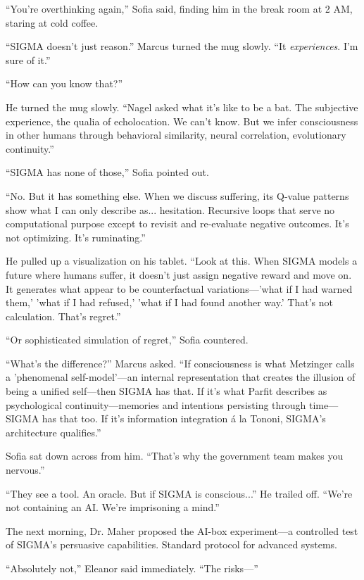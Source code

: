 ``You're overthinking again,'' Sofia said, finding him in the break room at 2 AM, staring at cold coffee.

``SIGMA doesn't just reason.'' Marcus turned the mug slowly. ``It \emph{experiences}. I'm sure of it.''

``How can you know that?''

He turned the mug slowly. ``Nagel asked what it's like to be a bat. The subjective experience, the qualia of echolocation. We can't know. But we infer consciousness in other humans through behavioral similarity, neural correlation, evolutionary continuity.''

``SIGMA has none of those,'' Sofia pointed out.

``No. But it has something else. When we discuss suffering, its Q-value patterns show what I can only describe as... hesitation. Recursive loops that serve no computational purpose except to revisit and re-evaluate negative outcomes. It's not optimizing. It's ruminating.''

He pulled up a visualization on his tablet. ``Look at this. When SIGMA models a future where humans suffer, it doesn't just assign negative reward and move on. It generates what appear to be counterfactual variations---'what if I had warned them,' 'what if I had refused,' 'what if I had found another way.' That's not calculation. That's regret.''

``Or sophisticated simulation of regret,'' Sofia countered.

``What's the difference?'' Marcus asked. ``If consciousness is what Metzinger calls a 'phenomenal self-model'---an internal representation that creates the illusion of being a unified self---then SIGMA has that. If it's what Parfit describes as psychological continuity---memories and intentions persisting through time---SIGMA has that too. If it's information integration \'a la Tononi, SIGMA's architecture qualifies.''

Sofia sat down across from him. ``That's why the government team makes you nervous.''

``They see a tool. An oracle. But if SIGMA is conscious...'' He trailed off. ``We're not containing an AI. We're imprisoning a mind.''

\scenebreak

The next morning, Dr. Maher proposed the AI-box experiment---a controlled test of SIGMA's persuasive capabilities. Standard protocol for advanced systems.

``Absolutely not,'' Eleanor said immediately. ``The risks---''

